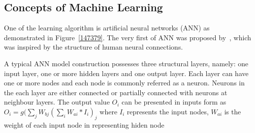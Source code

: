 \subsection{Concepts of Machine Learning}
One of the learning algorithm is artificial neural networks (ANN) as demonstrated in Figure~\ref{147379}. The very first of ANN was proposed by~\citet{McCulloch_1943}, which was inspired by the structure of human neural connections. 
\par 
A typical ANN model construction possesses three structural layers, namely: one input layer, one or more hidden layers and one output layer. Each layer can have one or more nodes and each node is commonly referred as a neuron. Neurons in the each layer are either connected or partially connected with neurons at neighbour layers. The output value $O_i$ can be presented in inputs form as
$O_i = g( \sum_{j} W_{bj}(\sum_{i} W_{ai} * I_i)_j$
where $I_i$ represents the input nodes, $W_{ai}$ is the weight of each input node in representing hiden node 